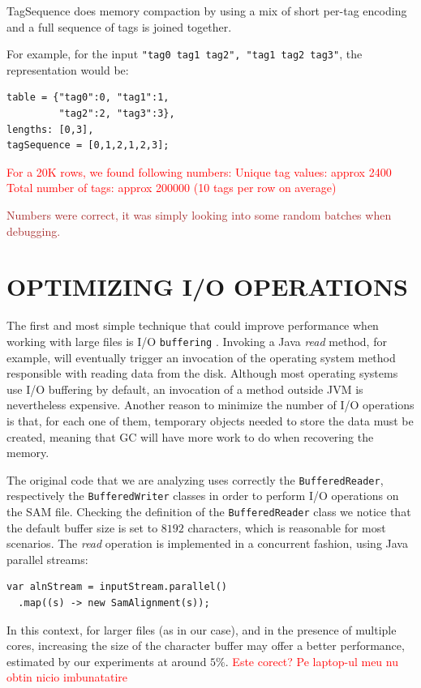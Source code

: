 \documentclass[a4paper,twoside]{article}
\begin{document}
TagSequence does memory compaction by using a mix of short per-tag encoding and a full sequence of tags is joined together.

For example, for the input {\tt "tag0 tag1 tag2", "tag1 tag2 tag3"}, the representation would be:
\begin{verbatim}
table = {"tag0":0, "tag1":1, 
         "tag2":2, "tag3":3},
lengths: [0,3], 
tagSequence = [0,1,2,1,2,3]; 
\end{verbatim}

\textcolor{red}{
For a 20K rows, we found following numbers:
Unique tag values: approx 2400
Total number of tags: approx 200000 (10 tags per row on average)
}

\textcolor{brown}{ Numbers were correct, it was simply looking into some random batches when debugging.
}





\section{\uppercase{Optimizing I/O Operations}}

The first and most simple technique that could improve performance when working with large files
is I/O {\tt buffering} \cite{oaks:2014}. Invoking a Java {\it read} method, for example, will eventually trigger an invocation of the operating system method responsible with reading data from the disk.
Although most operating systems use I/O buffering by default, an invocation of a method outside JVM is nevertheless expensive. Another reason to minimize the number of I/O operations is that, for each one of them, temporary objects needed to store the data must be created, meaning that GC will have more work to do when recovering the memory.

The original code that we are analyzing uses correctly the {\tt BufferedReader}, respectively the {\tt BufferedWriter} classes in order to perform I/O operations on the SAM file.
Checking the definition of the {\tt BufferedReader} class we notice that the default buffer size is set to $8192$ characters, which is reasonable for most scenarios. The {\it read} operation is implemented in a concurrent fashion, using Java parallel streams:
\begin{verbatim}
var alnStream = inputStream.parallel()
  .map((s) -> new SamAlignment(s));
\end{verbatim}
In this context, for larger files (as in our case), and in the presence of multiple cores, increasing the size of the character buffer may offer a better performance, estimated by our experiments at around $5\%$. \textcolor{red}{Este corect? Pe laptop-ul meu nu obtin nicio imbunatatire}
\end{document}
